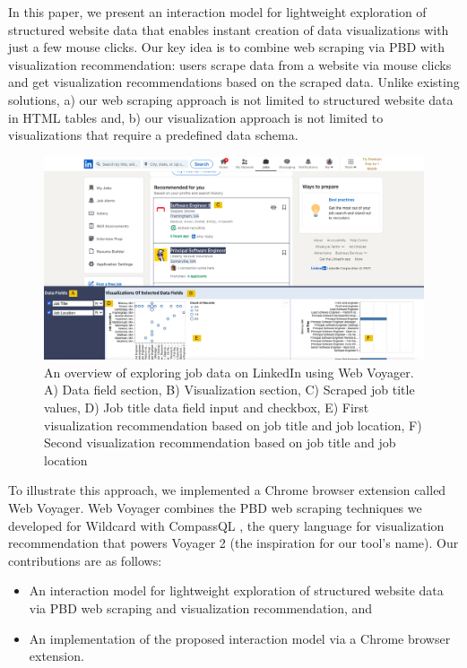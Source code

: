 \documentclass{vgtc}                          %
\begin{document}
In this paper, we present an interaction model for lightweight exploration of structured website data that enables instant creation
of data visualizations with just a few mouse clicks. Our key idea is to combine web scraping via PBD with visualization recommendation:
users scrape data from a website via mouse clicks and get visualization recommendations based on the scraped data. Unlike existing solutions,
a) our web scraping approach is not limited to structured website data in HTML tables and, b) our visualization approach is not limited to
visualizations that require a predefined data schema.

\begin{figure}
  \includegraphics[width=\textwidth]{figures/example}
  \caption{\label{fig:example}An overview of exploring job data on LinkedIn using Web Voyager. A) Data field section,
  B) Visualization section, C) Scraped job title values, D) Job title data field input and checkbox, E) First visualization
  recommendation based on job title and job location, F) Second visualization recommendation based on job title and job location}
  \label{fig:example}
\end{figure}

To illustrate this approach, we implemented a Chrome browser extension called Web Voyager. Web Voyager combines the PBD web scraping
techniques we developed for Wildcard \cite{litt2020} with CompassQL \cite{wongsuphasawat2016}, the query language for visualization
recommendation that powers Voyager 2 \cite{wongsuphasawat2017} (the inspiration for our tool’s name). Our contributions are as follows:

\begin{itemize}
 \item An interaction model for lightweight exploration of structured website data via PBD web scraping and visualization recommendation, and
 \item An implementation of the proposed interaction model via a Chrome browser extension.
\end{itemize}
\end{document}
